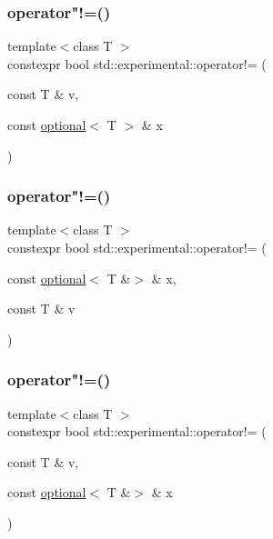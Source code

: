 \mbox{\label{namespacestd_1_1experimental_aa6a14a4a2f99c053eaf12e4d438786cc}} 
\subsubsection{\texorpdfstring{operator"!=()}{operator!=()}\hspace{0.1cm}{\footnotesize\ttfamily [5/9]}}
{\footnotesize\ttfamily template$<$class T $>$ \\
constexpr bool std\+::experimental\+::operator!= (\begin{DoxyParamCaption}\item[{const T \&}]{v,  }\item[{const \hyperlink{classstd_1_1experimental_1_1optional}{optional}$<$ T $>$ \&}]{x }\end{DoxyParamCaption})}

\mbox{\label{namespacestd_1_1experimental_a32e202bafe91eccccc3d34ef53bc3f01}} 
\subsubsection{\texorpdfstring{operator"!=()}{operator!=()}\hspace{0.1cm}{\footnotesize\ttfamily [6/9]}}
{\footnotesize\ttfamily template$<$class T $>$ \\
constexpr bool std\+::experimental\+::operator!= (\begin{DoxyParamCaption}\item[{const \hyperlink{classstd_1_1experimental_1_1optional}{optional}$<$ T \&$>$ \&}]{x,  }\item[{const T \&}]{v }\end{DoxyParamCaption})}

\mbox{\label{namespacestd_1_1experimental_aa2bc218261382e5d1dbb90aee5930580}} 
\subsubsection{\texorpdfstring{operator"!=()}{operator!=()}\hspace{0.1cm}{\footnotesize\ttfamily [7/9]}}
{\footnotesize\ttfamily template$<$class T $>$ \\
constexpr bool std\+::experimental\+::operator!= (\begin{DoxyParamCaption}\item[{const T \&}]{v,  }\item[{const \hyperlink{classstd_1_1experimental_1_1optional}{optional}$<$ T \&$>$ \&}]{x }\end{DoxyParamCaption})}

